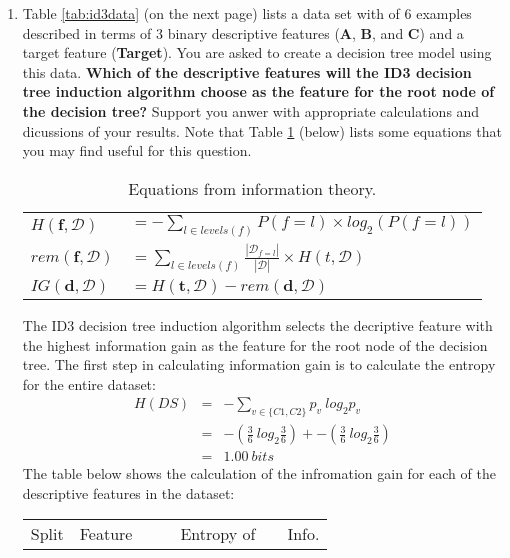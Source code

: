 \documentclass[solution]{ditpaper}
\begin{document}
\begin{enumerate}
		\item Table \ref{tab:id3data} (on the next page) lists a data set with of 6 examples described in terms of 3 binary descriptive features (\textbf{A}, \textbf{B}, and \textbf{C}) and a target feature (\textbf{Target}). You are asked to create a decision tree model using this data. \textbf{Which of the descriptive features will the ID3 decision tree induction algorithm choose as the feature for the root node of the decision tree?} Support you anwer with appropriate calculations and dicussions of your results. Note that Table \ref{tab:info-eqs} (below) lists some equations that you may find useful for this question.
	\begin{table}[!hb]
			\renewcommand{\arraystretch}{2}
	\begin{center}
	\caption{Equations from information theory.}
	\label{tab:info-eqs}
		\begin{tabular}{ll}
	\hline
	$H(\mathbf{f}, \mathcal{D})$ & $= -\displaystyle\sum_{l \in levels(f)} P(f=l) \times log_2(P(f=l))$\\
	$rem(\mathbf{f}, \mathcal{D})$ & $=\displaystyle\sum_{l \in levels(f)} \frac{|\mathcal{D}_{f=l}|}{|\mathcal{D}|} \times H(t, \mathcal{D})$\\
	$IG(\mathbf{d},\mathcal{D})$ & $=H(\mathbf{t}, \mathcal{D})-rem(\mathbf{d}, \mathcal{D})$\\
	\hline
	\end{tabular}
	\end{center}
	\end{table}		
		\begin{answer}
		The ID3 decision tree induction algorithm selects the decriptive feature with the highest information gain as the feature for the root node of the decision tree.  The first step in calculating information gain is to calculate the entropy for the entire dataset:
	\begin{eqnarray*}
H\left(DS\right) &=& - \sum_{v \in \{C1,C2\}} p_v ~ log_2 p_v\\
		&=& -\left(\frac{3}{6}~ log_2 \frac{3}{6}\right) + -\left(\frac{3}{6} ~log_2 \frac{3}{6}\right)\\
		&=& 1.00~bits
	\end{eqnarray*}
	The table below shows the calculation of the infromation gain for each of the descriptive features in the dataset:
		\begin{scriptsize}
\begin{tabular}{ccccccc}
Split & Feature &              &  & Entropy of &  & Info.\\

\end{tabular}
\end{scriptsize}
\end{answer}
\end{enumerate}
\end{document}
